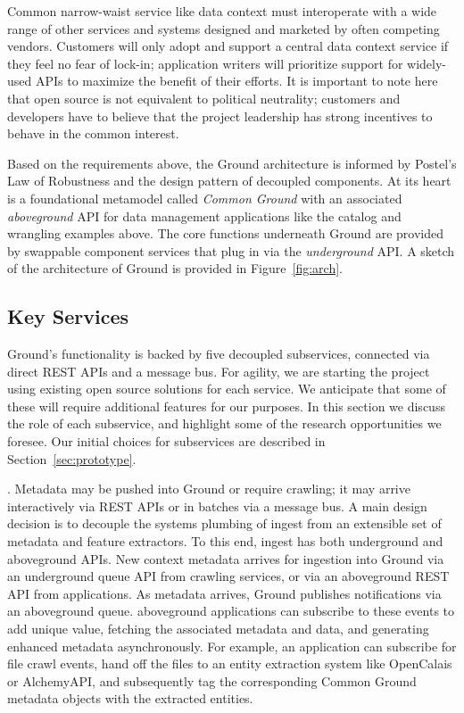 \documentclass{cidr-2017}
\begin{document}
Common narrow-waist service like data context must interoperate with a wide range of other services and systems designed and marketed by often competing vendors.
Customers will only adopt and support a central data context service if they feel no fear of lock-in; application writers will prioritize support for widely-used APIs to maximize the benefit of their efforts. 
It is important to note here that open source is not equivalent to political neutrality; customers and developers have to believe that the project leadership has strong incentives to behave in the common interest. 

\vspace{1em}
Based on the requirements above, the Ground architecture is informed by Postel's Law of Robustness and the design pattern of decoupled components. 
At its heart is a foundational metamodel called \emph{Common Ground} with an associated \emph{aboveground} API for data management applications like the catalog and wrangling examples above. 
The core functions underneath Ground are provided by swappable component services that plug in via the \emph{underground} API. 
A sketch of the architecture of Ground is provided in Figure~\ref{fig:arch}.


\subsection{Key Services}
Ground's functionality is backed by five decoupled subservices, connected via direct REST APIs and a message bus.  For agility, we are starting the project using existing open source solutions for each service.  We anticipate that some of these will require additional features for our purposes. In this section we discuss the role of each subservice, and highlight some of the research opportunities we foresee.  Our initial choices for subservices are described in Section~\ref{sec:prototype}.

.  Metadata may be pushed into Ground or require crawling; it may arrive interactively via REST APIs or in batches via a message bus. 
A main design decision is to decouple the systems plumbing of ingest from an extensible set of metadata and feature extractors.
To this end, ingest has both underground and aboveground APIs.
New context metadata arrives for ingestion into Ground via an underground queue API from crawling services, or via an aboveground REST API from applications. 
As metadata arrives, Ground publishes notifications via an aboveground queue. aboveground applications can subscribe to these events to add unique value, fetching the associated metadata and data, and generating enhanced metadata asynchronously. 
For example, an application can subscribe for file crawl events, hand off the files to an entity extraction system like OpenCalais or AlchemyAPI, and subsequently tag the corresponding Common Ground metadata objects with the extracted entities.
\end{document}
